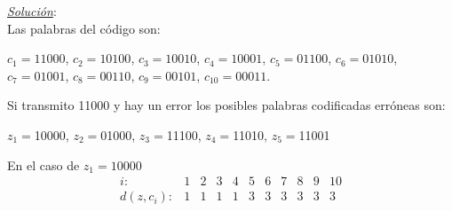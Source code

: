 \documentclass{beamer}
\theoremstyle{plain}
\theoremstyle{example}
\theoremstyle{example}
\begin{document}
\begin{frame}  \small 

\textit{\underline{Solución}}:\\

Las palabras del código son: 

\begin{center}
$c_1=11000$, $c_2=10100$, $c_3=10010$, $c_4=10001$, $c_5=01100$, $c_6=01010$, $c_7=01001$, $c_8=00110$, $c_9=00101$, $c_{10}=00011$.
\end{center}

Si transmito 11000 y hay un error los posibles palabras codificadas erróneas son:

\begin{center}
 $z_1=$10000, $z_2=$01000, $z_3=$11100, $z_4=$11010, $z_5=$11001
\end{center}

En el caso de $z_1=10000$
\[
 \begin{array}{lcccccccccc}
                 i:  & 1  & 2  & 3 & 4  & 5  & 6 & 7  & 8 & 9 & 10 \\
        d(z,c_i): & 1  & 1  & 1 & 1  & 3  & 3 & 3  & 3  & 3   &3 
           \end{array}
           \]
\end{frame} 





\end{document}
